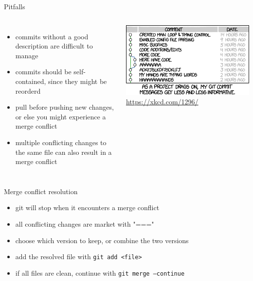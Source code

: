 \documentclass[10pt, graphics, aspectratio=169, table]{beamer}
\begin{document}
    \begin{frame}{Pitfalls}
        \begin{columns}
                \begin{itemize}
                    \item commits without a good description are difficult to manage
                    \item commits should be self-contained, since they might be reorderd
                    \item pull before pushing new changes, or else you might experience a merge conflict
                    \item multiple conflicting changes to the same file can also result in a merge conflict
                \end{itemize}
                \center\includegraphics[scale=0.45]{img/commit_msg.png}
                \center\tiny\url{https://xkcd.com/1296/}
        \end{columns}
    \end{frame}

    \begin{frame}{Merge conflict resolution}
        \begin{itemize}
            \item git will stop when it encounters a merge conflict
            \item all conflicting changes are market with "==="
            \item choose which version to keep, or combine the two versions
            \item add the resolved file with \texttt{git add <file>}
            \item if all files are clean, continue with \texttt{git merge --continue}
        \end{itemize}
    \end{frame}
\end{document}
